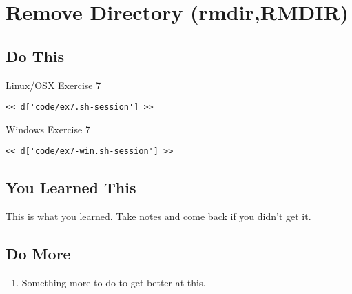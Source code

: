 \chapter{Remove Directory (rmdir,RMDIR)}

\section{Do This}

\begin{code}{Linux/OSX Exercise 7}
\begin{Verbatim}
<< d['code/ex7.sh-session'] >>
\end{Verbatim}
\end{code}

\begin{code}{Windows Exercise 7}
\begin{Verbatim}
<< d['code/ex7-win.sh-session'] >>
\end{Verbatim}
\end{code}

\section{You Learned This}

This is what you learned.  Take notes and come back if you didn't get it.

\section{Do More}

\begin{enumerate}
\item Something more to do to get better at this.
\end{enumerate}

